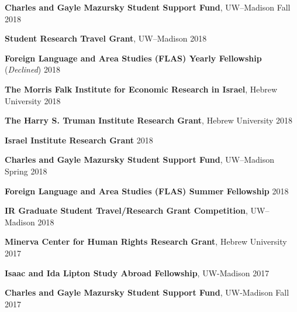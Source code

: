 \documentclass[11pt]{article}
\renewcommand{\section}[1]{\pagebreak[3]%
    \hyphenpenalty=10000%
    \vspace{1.3\baselineskip}%
    \phantomsection\addcontentsline{toc}{section}{#1}%
    \noindent\llap{\scshape\smash{\parbox[t]{\marginparwidth}{\raggedright #1}}}%
    \vspace{-\baselineskip}\par}
\begin{document}
\textbf{Charles and Gayle Mazursky Student Support Fund}, UW--Madison \hfill  Fall 2018\vspace{.01in}

\textbf{Student Research Travel Grant}, UW--Madison \hfill 2018\vspace{.01in}

\textbf{Foreign Language and Area Studies (FLAS) Yearly Fellowship} (\emph{Declined}) \hfill 2018\vspace{.01in}

\textbf{The Morris Falk Institute for Economic Research in Israel}, Hebrew University \hfill  2018\vspace{.01in}

\textbf{The Harry S. Truman Institute Research Grant}, Hebrew University \hfill  2018\vspace{.01in}

\textbf{Israel Institute Research Grant} \hfill  2018\vspace{.01in}

\textbf{Charles and Gayle Mazursky Student Support Fund}, UW--Madison \hfill  Spring 2018\vspace{.01in}

\textbf{Foreign Language and Area Studies (FLAS) Summer Fellowship} \hfill 2018\vspace{.01in}

\textbf{IR Graduate Student Travel/Research Grant Competition}, UW--Madison \hfill 2018\vspace{.01in}

\textbf{Minerva Center for Human Rights Research Grant}, Hebrew University \hfill 2017\vspace{.01in}

\textbf{Isaac and Ida Lipton Study Abroad Fellowship}, UW-Madison \hfill 2017\vspace{.01in}

\textbf{Charles and Gayle Mazursky Student Support Fund}, UW-Madison \hfill  Fall 2017\vspace{.01in}




\end{document}
